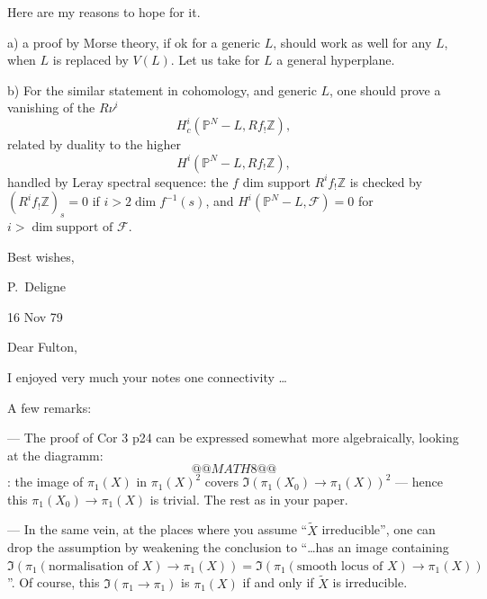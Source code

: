 \documentclass[11pt,a4paper]{article}
\theoremstyle{plain}
\theoremstyle{definition}
\begin{document}
\medskip

Here are my reasons to hope for it.

a) a proof by Morse theory, if ok for a generic $L$, should work as well for any $L$, when $L$ is replaced by $V(L)$. Let us take for $L$ a general hyperplane.

\newpage

b) For the similar statement in cohomology, and generic $L$, one should prove a vanishing of the $R\nu^i$
\[
H_c^i(\mathbb{P}^N - L, Rf_! \mathbb{Z}),
\]
related by duality to the higher
\[
H^i(\mathbb{P}^N - L, Rf_! \mathbb{Z}),
\]
handled by Leray spectral sequence: the $f$ dim support $R^i f_! \mathbb{Z}$ is checked by $(R^i f_! \mathbb{Z})_s = 0$ if $i > 2 \dim f^{-1}(s)$, and $H^i(\mathbb{P}^N - L, \mathcal{F}) = 0$ for $i > \dim \text{support of } \mathcal{F}$.

\vspace{1cm}

\begin{flushright}
Best wishes,

P.~Deligne
\end{flushright}

\newpage

\begin{flushright}
16 Nov 79
\end{flushright}

\noindent Dear Fulton,

\medskip

I enjoyed very much your notes one connectivity \ldots

A few remarks:

\medskip

--- The proof of Cor 3 p24 can be expressed somewhat more algebraically, looking at the diagramm:
\[
@@MATH8@@
\]: the image of $\pi_1(X)$ in $\pi_1(X)^2$ covers $\Im(\pi_1(X_0) \to \pi_1(X))^2$ --- hence this $\pi_1(X_0) \to \pi_1(X)$ is trivial. The rest as in your paper.

\medskip

--- In the same vein, at the places where you assume ``$\widetilde{X}$ irreducible'', one can drop the assumption by weakening the conclusion to ``\ldots has an image containing $\Im(\pi_1(\text{normalisation of } X) \to \pi_1(X)) = \Im(\pi_1(\text{smooth locus of } X) \to \pi_1(X))$''. Of course, this $\Im(\pi_1 \to \pi_1)$ is $\pi_1(X)$ if and only if $\widetilde{X}$ is irreducible.
\end{document}
